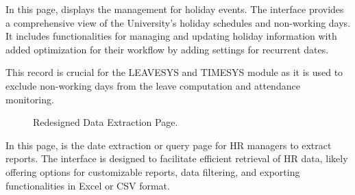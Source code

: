     In this page, displays the management for holiday events. The interface provides a comprehensive view of the University's holiday schedules and non-working days. It includes functionalities for managing and updating holiday information with added optimization for their workflow by adding settings for recurrent dates.

    This record is crucial for the LEAVESYS and TIMESYS module as it is used to exclude non-working days from the leave computation and attendance monitoring.

    \begin{figure}[H]
        \centering
        \caption{Redesigned Data Extraction Page.}
        \label{fig:app-data-extraction}
    \end{figure}

    In this page, is the date extraction or query page for HR managers to extract reports. The interface is designed to facilitate efficient retrieval of HR data, likely offering options for customizable reports, data filtering, and exporting functionalities in Excel or CSV format.

